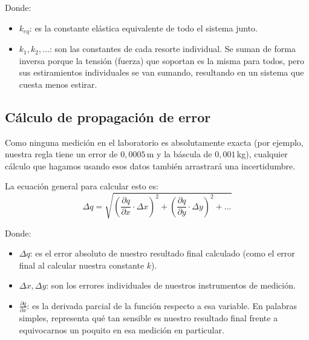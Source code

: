 \documentclass[12pt,a4paper]{article}
\begin{document}
Donde:
\begin{itemize}
    \item $k_{eq}$: es la constante elástica equivalente de todo el sistema junto.
    \item $k_1, k_2, \dots$: son las constantes de cada resorte individual. Se suman de forma inversa porque la tensión (fuerza) que soportan es la misma para todos, pero sus estiramientos individuales se van sumando, resultando en un sistema que cuesta menos estirar.
\end{itemize}

\subsection{Cálculo de propagación de error}
Como ninguna medición en el laboratorio es absolutamente exacta (por ejemplo, nuestra regla tiene un error de $0,0005$\,m y la báscula de $0,001$\,kg), cualquier cálculo que hagamos usando esos datos también arrastrará una incertidumbre.

La ecuación general para calcular esto es:
\begin{equation}
    \Delta q = \sqrt{\left(\frac{\partial q}{\partial x} \cdot \Delta x\right)^2 + \left(\frac{\partial q}{\partial y} \cdot \Delta y\right)^2 + \dots}
\end{equation}

Donde:
\begin{itemize}
    \item $\Delta q$: es el error absoluto de nuestro resultado final calculado (como el error final al calcular nuestra constante $k$).
    \item $\Delta x, \Delta y$: son los errores individuales de nuestros instrumentos de medición.
    \item $\frac{\partial q}{\partial x}$: es la derivada parcial de la función respecto a esa variable. En palabras simples, representa qué tan sensible es nuestro resultado final frente a equivocarnos un poquito en esa medición en particular.
\end{itemize}
\end{document}
